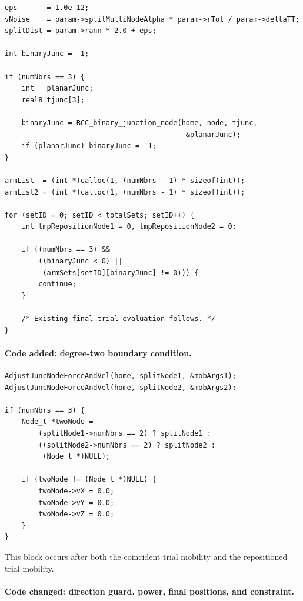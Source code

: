 \documentclass[11pt]{article}
\begin{document}
\begin{lstlisting}[style=cpp]
eps       = 1.0e-12;
vNoise    = param->splitMultiNodeAlpha * param->rTol / param->deltaTT;
splitDist = param->rann * 2.0 + eps;

int binaryJunc = -1;

if (numNbrs == 3) {
    int   planarJunc;
    real8 tjunc[3];

    binaryJunc = BCC_binary_junction_node(home, node, tjunc,
                                           &planarJunc);
    if (planarJunc) binaryJunc = -1;
}

armList  = (int *)calloc(1, (numNbrs - 1) * sizeof(int));
armList2 = (int *)calloc(1, (numNbrs - 1) * sizeof(int));

for (setID = 0; setID < totalSets; setID++) {
    int tmpRepositionNode1 = 0, tmpRepositionNode2 = 0;

    if ((numNbrs == 3) &&
        ((binaryJunc < 0) ||
         (armSets[setID][binaryJunc] != 0))) {
        continue;
    }

    /* Existing final trial evaluation follows. */
}
\end{lstlisting}

\paragraph{Code added: degree-two boundary condition.}

\begin{lstlisting}[style=cpp]
AdjustJuncNodeForceAndVel(home, splitNode1, &mobArgs1);
AdjustJuncNodeForceAndVel(home, splitNode2, &mobArgs2);

if (numNbrs == 3) {
    Node_t *twoNode =
        (splitNode1->numNbrs == 2) ? splitNode1 :
        ((splitNode2->numNbrs == 2) ? splitNode2 :
         (Node_t *)NULL);

    if (twoNode != (Node_t *)NULL) {
        twoNode->vX = 0.0;
        twoNode->vY = 0.0;
        twoNode->vZ = 0.0;
    }
}
\end{lstlisting}

This block occurs after both the coincident trial mobility and the
repositioned trial mobility.

\paragraph{Code changed: direction guard, power, final positions, and
constraint.}
\end{document}
